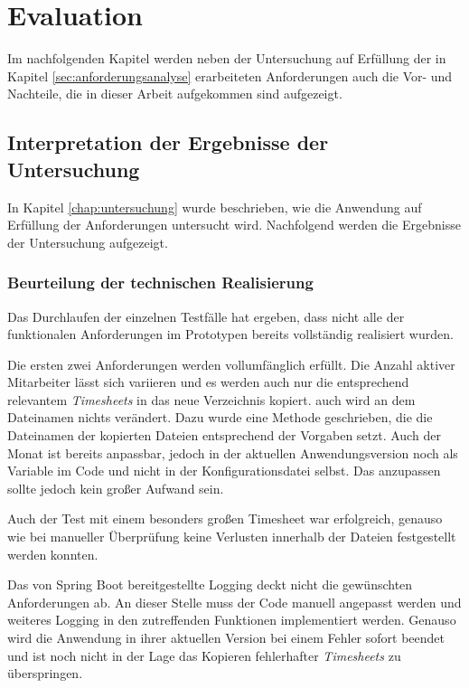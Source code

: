 \chapter{Evaluation}
Im nachfolgenden Kapitel werden neben der Untersuchung auf Erfüllung der in Kapitel \ref{sec:anforderungsanalyse} erarbeiteten Anforderungen auch die Vor- und Nachteile, die in dieser Arbeit aufgekommen sind aufgezeigt.

\section{Interpretation der Ergebnisse der Untersuchung}
\label{sec:untersuchung}
In Kapitel \ref{chap:untersuchung} wurde beschrieben, wie die Anwendung auf Erfüllung der Anforderungen untersucht wird. Nachfolgend werden die Ergebnisse der Untersuchung aufgezeigt.

\subsection{Beurteilung der technischen Realisierung}
Das Durchlaufen der einzelnen Testfälle hat ergeben, dass nicht alle der funktionalen Anforderungen im Prototypen bereits vollständig realisiert wurden.

Die ersten zwei Anforderungen werden vollumfänglich erfüllt. Die Anzahl aktiver Mitarbeiter lässt sich variieren und es werden auch nur die entsprechend relevantem \textit{\glspl{Timesheet}} in das neue Verzeichnis kopiert. auch wird an dem Dateinamen nichts verändert. Dazu wurde eine Methode geschrieben, die die Dateinamen der kopierten Dateien entsprechend der Vorgaben setzt. Auch der Monat ist bereits anpassbar, jedoch in der aktuellen Anwendungsversion noch als Variable im Code und nicht in der Konfigurationsdatei selbst. Das anzupassen sollte jedoch kein großer Aufwand sein.

Auch der Test mit einem besonders großen \gls{Timesheet} war erfolgreich, genauso wie bei manueller Überprüfung keine Verlusten innerhalb der Dateien festgestellt werden konnten.

Das von \gls{Spring Boot} bereitgestellte Logging deckt nicht die gewünschten Anforderungen ab. An dieser Stelle muss der Code manuell angepasst werden und weiteres Logging in den zutreffenden Funktionen implementiert werden. Genauso wird die Anwendung in ihrer aktuellen Version bei einem Fehler sofort beendet und ist noch nicht in der Lage das Kopieren fehlerhafter \textit{\glspl{Timesheet}} zu überspringen. \pagebreak

